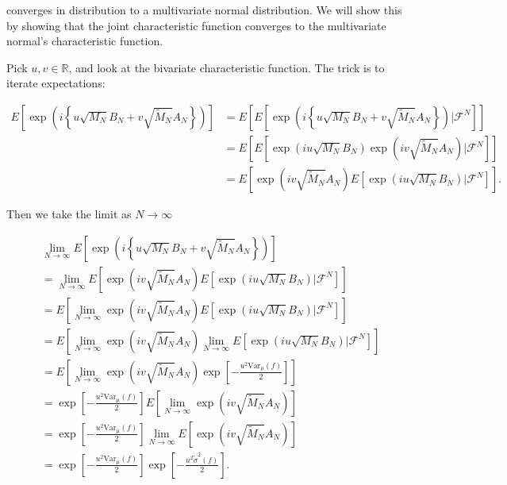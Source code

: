 \documentclass{article}
\begin{document}
converges in distribution to a multivariate normal distribution. We will show this by showing that the joint characteristic function converges to the multivariate normal's characteristic function.


Pick $u,v \in \mathbb{R}$, and look at the bivariate characteristic function. The trick is to iterate expectations:

\begin{align*}
E\left[\exp\left(i \left\{ u \sqrt{M_N} B_N + v \sqrt{\tilde{M}_N} A_N \right\} \right) \right]
&= E\left[ E\left[ \exp\left(i \left\{ u \sqrt{M_N} B_N + v \sqrt{\tilde{M}_N} A_N \right\} \right) \bigg\rvert \mathcal{F}^N\right] \right] \\
&= E\left[ E\left[ \exp\left(i u\sqrt{M_N} B_N \right) \exp\left(i v \sqrt{\tilde{M}_N} A_N  \right) \bigg\rvert \mathcal{F}^N\right] \right] \\
&= E\left[ \exp\left(i v \sqrt{\tilde{M}_N} A_N  \right) E\left[ \exp\left(i u \sqrt{M_N} B_N \right)  \bigg\rvert \mathcal{F}^N\right] \right] .
\end{align*}

Then we take the limit as $N \to \infty$

\begin{align*}
&\lim_{N \to \infty} E\left[\exp\left(i \left\{ u \sqrt{M_N} B_N + v \sqrt{\tilde{M}_N} A_N \right\} \right) \right] \\
&= \lim_{N \to \infty} E\left[ \exp\left(i v \sqrt{\tilde{M}_N} A_N  \right) E\left[ \exp\left(i u \sqrt{M_N} B_N \right)  \bigg\rvert \mathcal{F}^N\right] \right] \tag{previous} \\
&=  E\left[ \lim_{N \to \infty} \exp\left(i v \sqrt{\tilde{M}_N} A_N  \right) E\left[ \exp\left(i u \sqrt{M_N} B_N \right)  \bigg\rvert \mathcal{F}^N\right] \right] \tag{DCT} \\
&=  E\left[ \lim_{N \to \infty} \exp\left(i v \sqrt{\tilde{M}_N} A_N  \right) \lim_{N \to \infty}E\left[ \exp\left(i u \sqrt{M_N} B_N \right)  \bigg\rvert \mathcal{F}^N\right] \right]  \tag{limit properties} \\
&= E\left[ \lim_{N \to \infty} \exp\left(i v \sqrt{\tilde{M}_N} A_N  \right) \exp\left[-\frac{u^2 \text{Var}_{\mu}(f) }{2} \right] \right] \tag{Theorem 9.5.13} \\
&= \exp\left[-\frac{u^2 \text{Var}_{\mu}(f) }{2} \right]  E\left[ \lim_{N \to \infty} \exp\left(i v \sqrt{\tilde{M}_N} A_N  \right) \right] \tag{linearity of $E$} \\
&= \exp\left[-\frac{u^2 \text{Var}_{\mu}(f) }{2} \right] \lim_{N \to \infty}   E\left[ \exp\left(i v \sqrt{\tilde{M}_N} A_N  \right) \right] \tag{DCT} \\
&= \exp\left[-\frac{u^2 \text{Var}_{\mu}(f) }{2} \right] \exp\left[ - \frac{u^2  \tilde{\sigma}^2(f) }{2} \right] \tag{Previous subsection}. \\
\end{align*}
\end{document}
